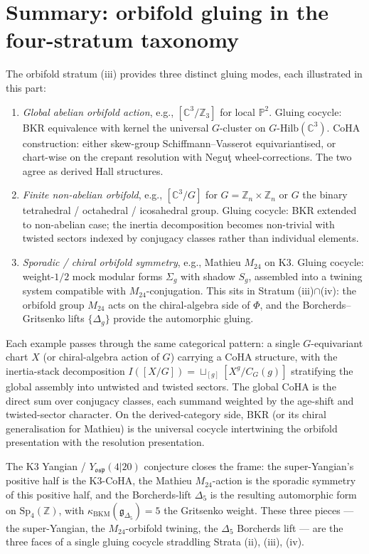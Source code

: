 \section{Summary: orbifold gluing in the four-stratum taxonomy}
\label{sec:orbifold-summary}

The orbifold stratum (iii) provides three distinct gluing modes, each illustrated in this part:
\begin{enumerate}
  \item \emph{Global abelian orbifold action}, e.g., $[\mathbb{C}^3/\mathbb{Z}_3]$ for local $\mathbb{P}^2$. Gluing cocycle: BKR equivalence with kernel the universal $G$-cluster on $G\text{-}\mathrm{Hilb}(\mathbb{C}^3)$. CoHA construction: either skew-group Schiffmann--Vasserot equivariantised, or chart-wise on the crepant resolution with Negu\c{t} wheel-corrections. The two agree as derived Hall structures.
  \item \emph{Finite non-abelian orbifold}, e.g., $[\mathbb{C}^3/G]$ for $G = \mathbb{Z}_n \times \mathbb{Z}_n$ or $G$ the binary tetrahedral / octahedral / icosahedral group. Gluing cocycle: BKR extended to non-abelian case; the inertia decomposition becomes non-trivial with twisted sectors indexed by conjugacy classes rather than individual elements.
  \item \emph{Sporadic / chiral orbifold symmetry}, e.g., Mathieu $M_{24}$ on K3. Gluing cocycle: weight-$1/2$ mock modular forms $\Sigma_g$ with shadow $S_g$, assembled into a twining system compatible with $M_{24}$-conjugation. This sits in Stratum (iii)$\cap$(iv): the orbifold group $M_{24}$ acts on the chiral-algebra side of $\Phi$, and the Borcherds--Gritsenko lifts $\{\Delta_g\}$ provide the automorphic gluing.
\end{enumerate}

Each example passes through the same categorical pattern: a single $G$-equivariant chart $X$ (or chiral-algebra action of $G$) carrying a CoHA structure, with the inertia-stack decomposition $I([X/G]) = \sqcup_{[g]} [X^g / C_G(g)]$ stratifying the global assembly into untwisted and twisted sectors. The global CoHA is the direct sum over conjugacy classes, each summand weighted by the age-shift and twisted-sector character. On the derived-category side, BKR (or its chiral generalisation for Mathieu) is the universal cocycle intertwining the orbifold presentation with the resolution presentation.

The K3 Yangian / $Y_{\mathfrak{osp}}(4|20)$ conjecture closes the frame: the super-Yangian's positive half is the K3-CoHA, the Mathieu $M_{24}$-action is the sporadic symmetry of this positive half, and the Borcherds-lift $\Delta_5$ is the resulting automorphic form on $\mathrm{Sp}_4(\mathbb{Z})$, with $\kappa_{\mathrm{BKM}}(\mathfrak{g}_{\Delta_5}) = 5$ the Gritsenko weight. These three pieces --- the super-Yangian, the $M_{24}$-orbifold twining, the $\Delta_5$ Borcherds lift --- are the three faces of a single gluing cocycle straddling Strata (ii), (iii), (iv).

